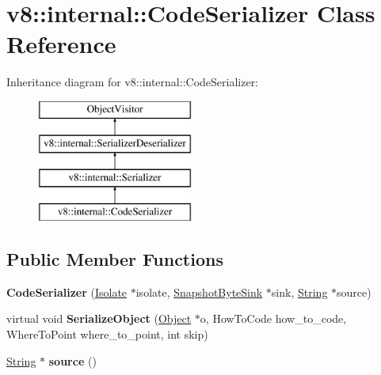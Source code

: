 \hypertarget{classv8_1_1internal_1_1_code_serializer}{}\section{v8\+:\+:internal\+:\+:Code\+Serializer Class Reference}
\label{classv8_1_1internal_1_1_code_serializer}
Inheritance diagram for v8\+:\+:internal\+:\+:Code\+Serializer\+:\begin{figure}[H]
\begin{center}
\leavevmode
\includegraphics[height=4.000000cm]{classv8_1_1internal_1_1_code_serializer}
\end{center}
\end{figure}
\subsection*{Public Member Functions}
\begin{DoxyCompactItemize}
\item 
\hypertarget{classv8_1_1internal_1_1_code_serializer_a2fd176322fe454f1a88e7e145fa96cbb}{}{\bfseries Code\+Serializer} (\hyperlink{classv8_1_1internal_1_1_isolate}{Isolate} $\ast$isolate, \hyperlink{classv8_1_1internal_1_1_snapshot_byte_sink}{Snapshot\+Byte\+Sink} $\ast$sink, \hyperlink{classv8_1_1internal_1_1_string}{String} $\ast$source)\label{classv8_1_1internal_1_1_code_serializer_a2fd176322fe454f1a88e7e145fa96cbb}

\item 
\hypertarget{classv8_1_1internal_1_1_code_serializer_ab1cf5d60d6f871a2165d1afb9c96c2b1}{}virtual void {\bfseries Serialize\+Object} (\hyperlink{classv8_1_1internal_1_1_object}{Object} $\ast$o, How\+To\+Code how\+\_\+to\+\_\+code, Where\+To\+Point where\+\_\+to\+\_\+point, int skip)\label{classv8_1_1internal_1_1_code_serializer_ab1cf5d60d6f871a2165d1afb9c96c2b1}

\item 
\hypertarget{classv8_1_1internal_1_1_code_serializer_a82aedc0b7fdb113d775000d0d95b92fe}{}\hyperlink{classv8_1_1internal_1_1_string}{String} $\ast$ {\bfseries source} ()\label{classv8_1_1internal_1_1_code_serializer_a82aedc0b7fdb113d775000d0d95b92fe}

\end{DoxyCompactItemize}
